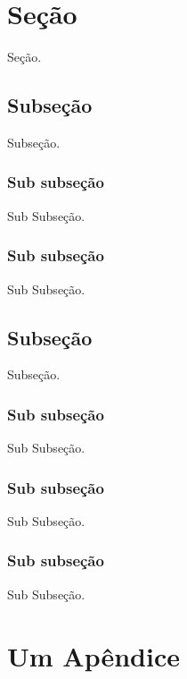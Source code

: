 \documentclass[11pt,a4paper]{article}
\begin{document}
\section{Seção}
Seção.

\subsection{Subseção}\label{sec:subsec2}
Subseção.

\subsubsection{Sub subseção}
Sub Subseção.

\subsubsection{Sub subseção}
Sub Subseção.

\subsection{Subseção}
Subseção.

\subsubsection{Sub subseção}
Sub Subseção.

\subsubsection{Sub subseção}
Sub Subseção.

\subsubsection{Sub subseção}
Sub Subseção.




\appendix %
\newpage
\section{Um Ap\^{e}ndice}
\end{document}
